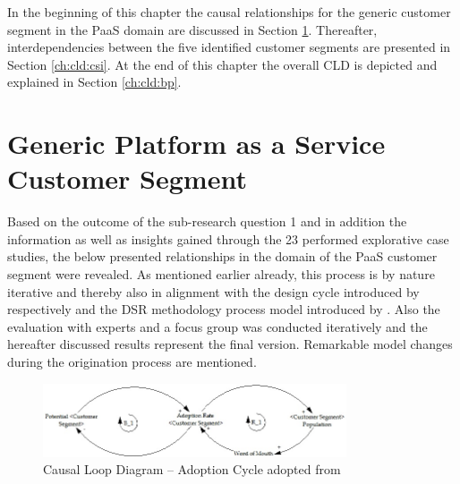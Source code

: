 In the beginning of this chapter the causal relationships for the generic customer segment in the \ac{PaaS} domain are discussed in Section \ref{ch:cld:cs}. Thereafter, interdependencies between the five identified customer segments are presented in Section \ref{ch:cld:csi}. At the end of this chapter the overall \ac{CLD} is depicted and explained in Section \ref{ch:cld:bp}.

\section{Generic Platform as a Service Customer Segment}\label{ch:cld:cs}

Based on the outcome of the sub-research question 1 and in addition the information as well as insights gained through the 23 performed explorative case studies, the below presented relationships in the domain of the \ac{PaaS} customer segment were revealed. As mentioned earlier already, this process is by nature iterative and thereby also in alignment with the design cycle introduced by \citet{Hevner2004} respectively \citet{Hevner2007} and the \ac{DSR} methodology process model introduced by \citet{Peffers2007}. Also the evaluation with experts and a focus group was conducted iteratively and the hereafter discussed results represent the final version. Remarkable model changes during the origination process are mentioned.

\begin{figure}[tb]
	\centering
	\includegraphics[width=0.8\textwidth]{gfx/cld_adoptionRate}
	\caption[Causal Loop Diagram -- Adoption Cycle]{Causal Loop Diagram -- Adoption Cycle adopted from \citet[p. 18]{Sterman2001}}
	\label{fig:cld_ac}
\end{figure}

